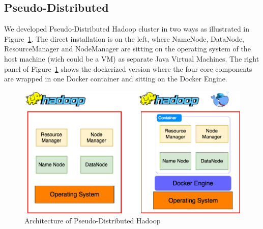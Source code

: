 \subsection{Pseudo-Distributed}\label{ss:pseudo-distributed}

We developed Pseudo-Distributed Hadoop cluster in two ways as
illustrated in Figure~\ref{f:hadoop-pseudo}. The direct installation
is on the left, where NameNode, DataNode, ResourceManager and
NodeManager are sitting on the operating system of the host machine
(wich could be a VM) as separate Java Virtual Machines. The right
panel of Figure~\ref{f:hadoop-pseudo} shows the dockerized version
where the four core components are wrapped in one Docker container and
sitting on the Docker Engine.

\begin{figure}[!ht]
	\centering\includegraphics[width=\columnwidth]{images/hadoop-docker-pseudo.png}
	\caption{Architecture of Pseudo-Distributed 
	Hadoop}\label{f:hadoop-pseudo}
\end{figure}

